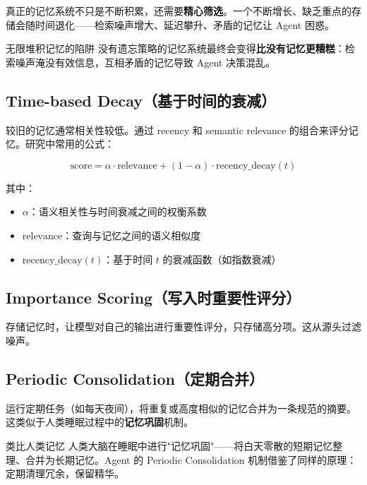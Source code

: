 \documentclass[a4paper]{article}
\begin{document}
真正的记忆系统不只是不断积累，还需要\textbf{精心筛选}。一个不断增长、缺乏重点的存储会随时间退化——检索噪声增大、延迟攀升、矛盾的记忆让 Agent 困惑。

\begin{warningbox}{无限堆积记忆的陷阱}
没有遗忘策略的记忆系统最终会变得\textbf{比没有记忆更糟糕}：检索噪声淹没有效信息，互相矛盾的记忆导致 Agent 决策混乱。
\end{warningbox}

\subsection{Time-based Decay（基于时间的衰减）}

较旧的记忆通常相关性较低。通过 recency 和 semantic relevance 的组合来评分记忆。研究中常用的公式：

$$
\text{score} = \alpha \cdot \text{relevance} + (1 - \alpha) \cdot \text{recency\_decay}(t)
$$

其中：
\begin{itemize}[leftmargin=2em]
    \item $\alpha$：语义相关性与时间衰减之间的权衡系数
    \item $\text{relevance}$：查询与记忆之间的语义相似度
    \item $\text{recency\_decay}(t)$：基于时间 $t$ 的衰减函数（如指数衰减）
\end{itemize}

\subsection{Importance Scoring（写入时重要性评分）}

存储记忆时，让模型对自己的输出进行重要性评分，只存储高分项。这从源头过滤噪声。

\subsection{Periodic Consolidation（定期合并）}

运行定期任务（如每天夜间），将重复或高度相似的记忆合并为一条规范的摘要。这类似于人类睡眠过程中的\textbf{记忆巩固}机制。

\begin{knowledgebox}{类比人类记忆}
人类大脑在睡眠中进行"记忆巩固"——将白天零散的短期记忆整理、合并为长期记忆。Agent 的 Periodic Consolidation 机制借鉴了同样的原理：定期清理冗余，保留精华。
\end{knowledgebox}
\end{document}
